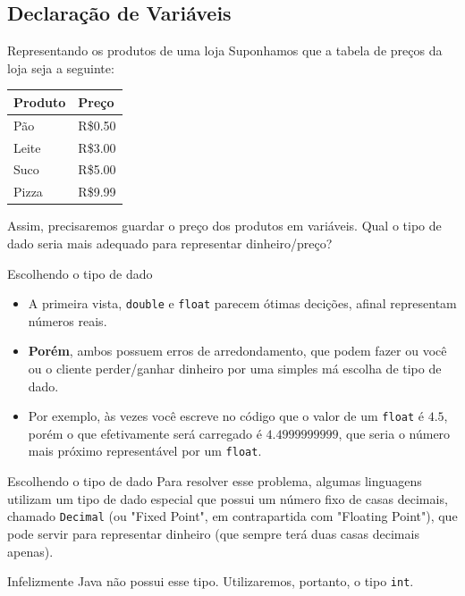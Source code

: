 \documentclass{beamer}
\begin{document}
\subsection{Declaração de Variáveis}

\begin{frame}{Representando os produtos de uma loja}
    Suponhamos que a tabela de preços da loja seja a seguinte:

    \begin{center}
        \begin{tabular}{|l|l|}
            \hline Produto & Preço \\ \hline
            Pão   & R\$0.50 \\
            Leite & R\$3.00 \\
            Suco  & R\$5.00 \\
            Pizza & R\$9.99 \\
            \hline
        \end{tabular}
    \end{center}

    Assim, precisaremos guardar o preço dos produtos em variáveis.
    Qual o tipo de dado seria mais adequado para representar dinheiro/preço?
\end{frame}

\begin{frame}{Escolhendo o tipo de dado}
    \begin{itemize}
        \item A primeira vista, \texttt{double} e \texttt{float} parecem ótimas
            decições, afinal representam números reais.
        \item \textbf{Porém}, ambos possuem erros de arredondamento, que podem
            fazer ou você ou o cliente perder/ganhar dinheiro por uma simples
            má escolha de tipo de dado.
        \item Por exemplo, às vezes você escreve no código que o valor de um
            \texttt{float} é $4.5$, porém o que efetivamente será carregado é
            $4.4999999999$, que seria o número mais próximo representável por
            um \texttt{float}.
    \end{itemize}
\end{frame}

\begin{frame}{Escolhendo o tipo de dado}
    Para resolver esse problema, algumas linguagens utilizam um tipo de dado
    especial que possui um número fixo de casas decimais, chamado
    \texttt{Decimal} (ou "Fixed Point", em contrapartida com "Floating Point"),
    que pode servir para representar dinheiro (que sempre terá duas casas
    decimais apenas).

    Infelizmente Java não possui esse tipo. Utilizaremos, portanto, o tipo
    \texttt{int}.
\end{frame}
\end{document}
